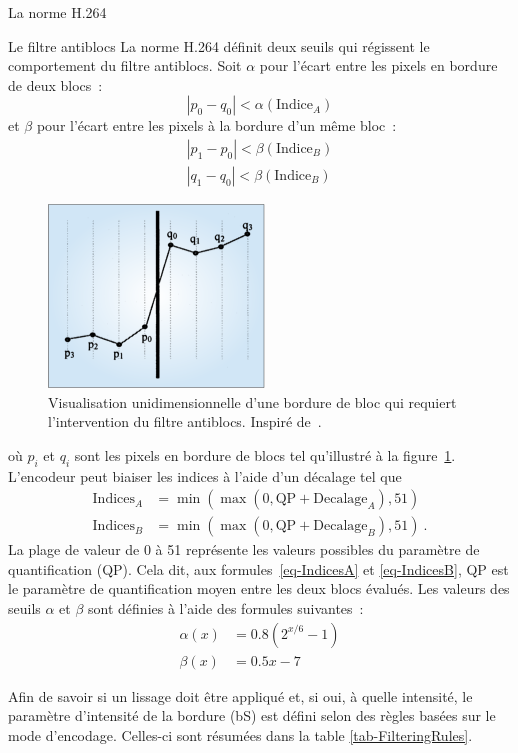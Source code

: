 \documentclass[letterpaper, twoside, 12pt,memoire]{thETS}
\begin{document}
\begin{chapter}{La norme H.264}
\begin{section}{Le filtre antiblocs}
La norme H.264 définit deux seuils qui régissent le comportement du filtre
antiblocs. Soit $\alpha$ pour l'écart entre les pixels en bordure de deux
blocs~:
\begin{equation}
\left| p_0 - q_0 \right| < \alpha(\text{Indice}_A)
\end{equation}
et $\beta$ pour l'écart entre les pixels à la bordure d'un même bloc~:
\begin{align}
\left| p_1 - p_0 \right| < \beta(\text{Indice}_B)\\
\left| q_1 - q_0 \right| < \beta(\text{Indice}_B)
\end{align}
\begin{figure}[htb]
\centering
\includegraphics[scale=0.65]{images/BlockyEdge.png}
\caption{Visualisation unidimensionnelle d'une bordure de bloc qui requiert
l'intervention du filtre antiblocs. Inspiré de~\citep{list2003}.}
\label{fig-BlockyEdge}
\end{figure}
où $p_i$ et $q_i$ sont les pixels en bordure de blocs tel qu'illustré à la
figure~\ref{fig-BlockyEdge}. L'encodeur peut biaiser les indices à l'aide
d'un décalage tel que
\begin{align}
\label{eq-IndicesA}
\text{Indices}_A &= \min(\max(0,\text{QP}+\text{Decalage}_A), 51)\\
\label{eq-IndicesB}
\text{Indices}_B &= \min(\max(0,\text{QP}+\text{Decalage}_B), 51)\:.
\end{align}
La plage de valeur de 0 à 51 représente les valeurs possibles du paramètre de
quantification (QP). Cela dit, aux formules~\ref{eq-IndicesA} et
\ref{eq-IndicesB}, QP est le paramètre de quantification moyen entre les deux
blocs évalués. Les valeurs des seuils $\alpha$ et $\beta$ sont définies à l'aide
des formules suivantes~:
\begin{align}
\alpha(x) &= 0.8(2^{x/6}-1)\\
\beta(x) &= 0.5x-7
\end{align}

Afin de savoir si un lissage doit être appliqué et, si oui, à quelle
intensité, le paramètre d'intensité de la bordure (bS) est défini selon des
règles basées sur le mode d'encodage. Celles-ci sont résumées dans la table
\ref{tab-FilteringRules}.


\end{section}
\end{chapter}
\end{document}
